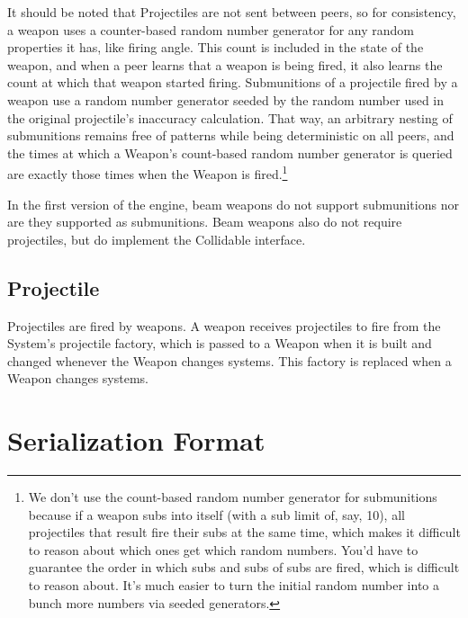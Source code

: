 \documentclass{article}
\begin{document}
It should be noted that Projectiles are not sent between peers, so for consistency, a weapon uses a counter-based random number generator for any random properties it has, like firing angle. This count is included in the state of the weapon, and when a peer learns that a weapon is being fired, it also learns the count at which that weapon started firing. Submunitions of a projectile fired by a weapon use a random number generator seeded by the random number used in the original projectile's inaccuracy calculation. That way, an arbitrary nesting of submunitions remains free of patterns while being deterministic on all peers, and the times at which a Weapon's count-based random number generator is queried are exactly those times when the Weapon is fired.\footnote{We don't use the count-based random number generator for submunitions because if a weapon subs into itself (with a sub limit of, say, 10), all projectiles that result fire their subs at the same time, which makes it difficult to reason about which ones get which random numbers. You'd have to guarantee the order in which subs and subs of subs are fired, which is difficult to reason about. It's much easier to turn the initial random number into a bunch more numbers via seeded generators.}

In the first version of the engine, beam weapons do not support submunitions nor are they supported as submunitions. Beam weapons also do not require projectiles, but do implement the Collidable interface.

\subsection{Projectile}
Projectiles are fired by weapons. A weapon receives projectiles to fire from the System's projectile factory, which is passed to a Weapon when it is built and changed whenever the Weapon changes systems. This factory is replaced when a Weapon changes systems.


\section{Serialization Format}
\end{document}
